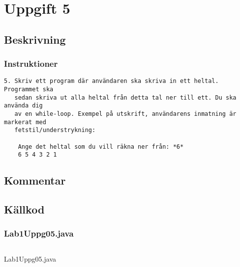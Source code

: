 \section{Uppgift 5}\label{uppgift-5}

\subsection{Beskrivning}
\subsubsection*{Instruktioner}
\begin{verbatim}
5. Skriv ett program där användaren ska skriva in ett heltal. Programmet ska
   sedan skriva ut alla heltal från detta tal ner till ett. Du ska använda dig
   av en while-loop. Exempel på utskrift, användarens inmatning är markerat med
   fetstil/understrykning:

    Ange det heltal som du vill räkna ner från: *6*
    6 5 4 3 2 1
\end{verbatim}

\subsection{Kommentar}


\subsection{Källkod}\label{uppgift-5_src}
\subsubsection*{Lab1Uppg05.java}
    \inputminted[linenos]{java}{src/Lab1Uppg05.java}
    \caption{Lab1Uppg05.java}
    \label{Uppg5src}
